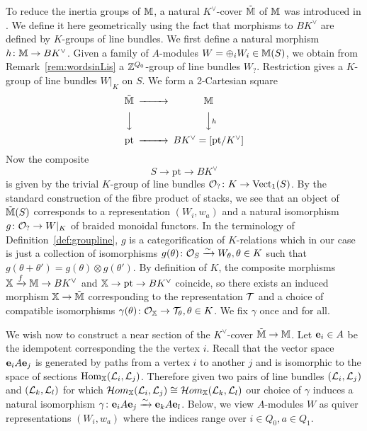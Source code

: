 \documentclass[12pt]{amsart}
\begin{document}
To reduce the inertia groups of $\mathbb{M}$, a natural $K^{\vee}$-cover $\tilde{\mathbb{M}}$ of $\mathbb{M}$ was introduced in \cite[Definition~3.2]{Abd}. We define it here geometrically using the fact that morphisms to $BK^{\vee}$ are defined by $K$-groups of line bundles. We first define a natural morphism $h \colon \mathbb{M} \rightarrow BK^{\vee}$. Given a family of $A$-modules $W = \oplus_i W_i \in \mathbb{M}(S)$, we obtain from Remark~\ref{rem:wordsinLis} a $\mathbb{Z}^{Q_0}$-group of line bundles $W_?$. Restriction gives a $K$-group of line bundles $W|_K$ on $S$. We form a 2-Cartesian square
\begin{equation*}
\begin{CD}
\tilde{\bM} @>>> \bM \\
@VVV @VVhV \\
\text{pt} @>>> BK^{\vee} = [\text{pt}/K^{\vee}]
\end{CD}
\end{equation*}
Now the composite
$$ S \to \text{pt}  \to BK^{\vee}$$
is given by the trivial $K$-group of line bundles $\mathcal{O}_? \colon K \to \operatorname{Vect}_1(S)$. 
By the standard construction of the fibre product of stacks, we see that an object of $\tilde{\mathbb{M}}(S)$ corresponds to a representation $(W_i,w_a)$ and a natural isomorphism $g\colon \mathcal{O}_? \to W|_K$ of braided monoidal functors. In the terminology of Definition~\ref{def:groupline}, $g$ is a categorification of $K$-relations which in our case is just a collection of isomorphisms $g(\theta) \colon \mathcal{O}_S \xrightarrow{\sim} W_{\theta}, \theta \in K$ such that $g(\theta + \theta') = g(\theta) \otimes g(\theta')$. By definition of $K$, the composite morphisms $\mathbb{X} \xrightarrow{f} \mathbb{M} \rightarrow BK^{\vee}$ and $\mathbb{X} \rightarrow \text{pt} \rightarrow BK^{\vee}$ coincide, so there exists an induced morphism $\mathbb{X} \rightarrow \tilde{\mathbb{M}}$ corresponding to the representation $\mathcal{T}$ and a choice of compatible isomorphisms $\gamma(\theta) \colon \mathcal{O}_{\mathbb{X}} \rightarrow \mathcal{T}_{\theta}, \theta \in K$. We fix $\gamma$ once and for all.  

We wish now to construct a near section of the $K^{\vee}$-cover $\tilde{\mathbb{M}} \rightarrow \mathbb{M}$. Let $\mathbf{e}_i \in A$ be the idempotent corresponding the the vertex $i$. Recall that the vector space $\mathbf{e}_i A \mathbf{e}_j$ is generated by paths from a vertex $i$ to another $j$ and is isomorphic to the space of sections $\operatorname{Hom}_{\mathbb{X}} (\mathcal{L}_i, \mathcal{L}_j)$. Therefore given two pairs of line bundles $(\mathcal{L}_i, \mathcal{L}_j)$ and $(\mathcal{L}_k, \mathcal{L}_l)$ for which $\mathop{{\mathcal{H}}om}\nolimits_{\mathbb{X}}(\mathcal{L}_i, \mathcal{L}_j) \cong \mathop{{\mathcal{H}}om}\nolimits_{\mathbb{X}}(\mathcal{L}_k, \mathcal{L}_l)$ our choice of $\gamma$ induces a natural  isomorphism $\gamma \colon \mathbf{e}_i A \mathbf{e}_j \xrightarrow{\sim} \mathbf{e}_k A \mathbf{e}_l$. Below, we view $A$-modules $W$ as quiver representations $(W_i,w_a)$ where the indices range over $i \in Q_0, a \in Q_1$. 
\end{document}
